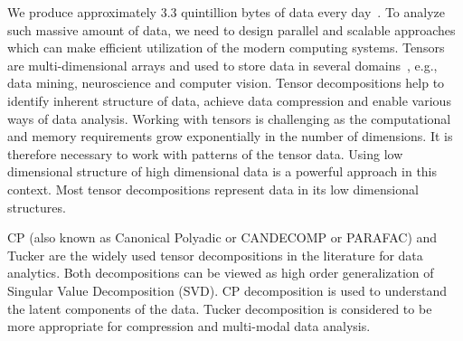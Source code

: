 \documentclass[a4paper,11pt]{article}
\newcommand{\bora}[1]{{\color{magenta} \emph{#1}}}
\newcommand{\sk}[1]{{\color{blue} \emph{#1}}}
\begin{document}
	
	We produce approximately 3.3 quintillion bytes of data every day~\cite{data-size-2024}. To analyze such massive amount of data, we need to design parallel and scalable approaches which can make efficient utilization of the modern computing systems. Tensors are multi-dimensional arrays and used to store data in several domains~\cite{KB-SIAM-2009}, e.g., data mining, neuroscience and computer vision. Tensor decompositions help to identify inherent structure of data, achieve data compression and enable various ways of data analysis.
	Working with tensors is challenging as the computational and memory requirements grow exponentially in the number of dimensions. It is therefore necessary to work with patterns of the tensor data. Using low dimensional structure of high dimensional data is a powerful approach in this context. Most tensor decompositions represent data in its low dimensional structures.
	
	

	CP (also known as Canonical Polyadic or CANDECOMP or PARAFAC) and Tucker are the widely used tensor decompositions in the literature for data analytics. Both decompositions can be viewed as high order generalization of Singular Value Decomposition (SVD). CP decomposition is used to understand the latent components of the data. Tucker decomposition is considered to be more appropriate for compression and multi-modal data analysis.
	
\end{document}
